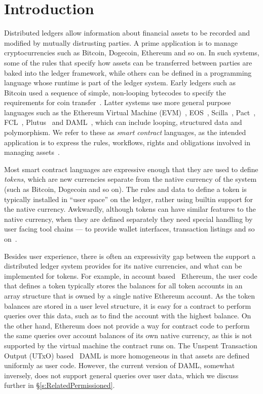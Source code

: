 
\section{Introduction}
Distributed ledgers allow information about financial assets to be recorded and modified by mutually distrusting parties. A prime application is to manage cryptocurrencies such as Bitcoin, Dogecoin, Ethereum and so on. In such systems, some of the rules that specify how assets can be transferred between parties are baked into the ledger framework, while others can be defined in a programming language whose runtime is part of the ledger system. Early ledgers such as Bitcoin used a sequence of simple, non-looping bytecodes to specify the requirements for coin transfer~\cite{Atzei2017:BitcoinTransactions}. Latter systems use more general purpose languages such as the Ethereum Virtual Machine (EVM)~\cite{Wood2014:Ethereum}, EOS~\cite{Grigg2017:EosIntroduction}, Scilla~\cite{Sergey2018:Scilla}, Pact~\cite{Popejpy2016:Pact}, FCL~\cite{Adjoint2019:FCL}, Plutus~\cite{IOHK2018:Plutus} and DAML~\cite{DA2019:DAML}, which can include looping, structured data and polymorphism. We refer to these as \emph{smart contract} languages, as the intended application is to express the rules, workflows, rights and obligations involved in managing assets~\cite{Harz2018:SurveyLanguages}.

Most smart contract languages are expressive enough that they are used to define \emph{tokens}, which are new currencies separate from the native currency of the system (such as Bitcoin, Dogecoin and so on). The rules and data to define a token is typically installed in ``user space'' on the ledger, rather using builtin support for the native currency. Awkwardly, although tokens can have similar features to the native currency, when they are defined separately they need special handling by user facing tool chains --- to provide wallet interfaces, transaction listings and so on~\cite{Vogelsteller2015:ERC20}.

Besides user experience, there is often an expressivity gap between the support a distributed ledger system provides for its native currencies, and what can be implemented for tokens. For example, in account based~\cite{Zahnentferner2018:Chimeric} Ethereum, the user code that defines a token typically stores the balances for all token accounts in an array structure that is owned by a single native Ethereum account. As the token balances are stored in a user level structure, it is easy for a contract to perform queries over this data, such as to find the account with the highest balance. On the other hand, Ethereum does not provide a way for contract code to perform the same queries  over account balances of its own native currency, as this is not supported by the virtual machine the contract runs on. The Unspent Transaction Output (UTxO) based~\cite{Zahnentferner2018:UTxO} DAML is more homogeneous in that assets are defined uniformly as user code. However, the current version of DAML, somewhat inversely, does not support general queries over user data, which we discuss further in \S\ref{s:RelatedPermissioned}.


